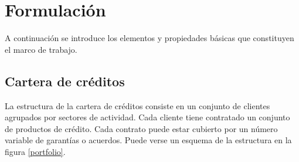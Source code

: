 
%
%
%
%
%
%
%
%

\chapter{Formulaci\'on}
\label{sec:formulation}

\begin{center}
\end{center}

A continuaci\'on se introduce los elementos y propiedades b\'asicas que 
constituyen el marco de trabajo.


\section{Cartera de cr\'editos}

La estructura de la cartera de cr\'editos consiste en un conjunto de
clientes agrupados por sectores de actividad. Cada cliente tiene contratado 
un conjunto de productos de cr\'edito. Cada contrato puede estar 
cubierto por un n\'umero variable de garant\'ias o acuerdos.
Puede verse un esquema de la estructura en la figura \ref{portfolio}.


